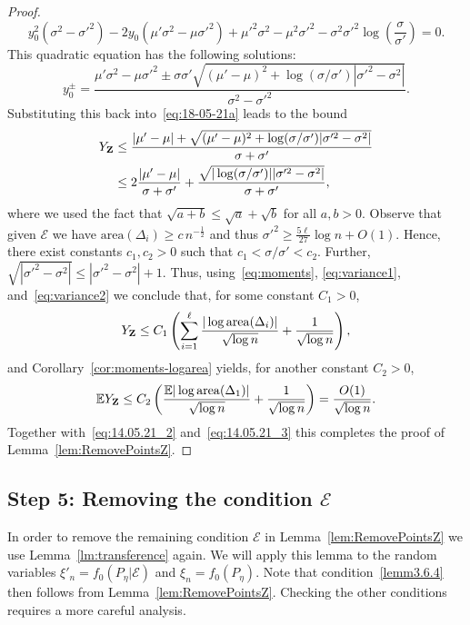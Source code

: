 \documentclass[AHL,Unicode,longabstracts,published]{cedram}
\newcommand{\bbE}{\mathbb{E}}
\newcommand{\clE}{\mathcal{E}}
\newcommand{\area}{\mathrm{area}}
\begin{document}
\begin{proof}
\[
y_0^2\left(\sigma^2-\sigma'^2\right)-2y_0\left(\mu'\sigma^2-\mu\sigma'^2\right)+\mu'^2\sigma^2-\mu^2\sigma'^2-\sigma^2\sigma'^2\log\left(\frac{\sigma}{\sigma'}\right)=0.
\]
This quadratic equation has the following solutions:
\[
y^{\pm}_0=\frac{\mu'\sigma^2-\mu\sigma'^2\pm\sigma\sigma'\sqrt{(\mu'-\mu)^2+\log(\sigma/\sigma')|\sigma'^2-\sigma^2|}}{\sigma^2-\sigma'^2}.
\]
Substituting this back into~\eqref{eq:18-05-21a} leads to the bound
\begin{align*}
Y_{\bf{Z}} & \leq \frac{|\mu'-\mu|+\sqrt{(\mu'-\mu)^2+\log(\sigma/\sigma')|\sigma'^2-\sigma^2|}}{\sigma+\sigma'}
\\ & \leq 2\frac{|\mu'-\mu|}{\sigma+\sigma'} + \frac{\sqrt{|\log(\sigma/ \sigma')||\sigma'^2-\sigma^2|}}{\sigma+\sigma'},
\end{align*}
where we used the fact that $\sqrt{a+b} \leq \sqrt a + \sqrt b$ for all $a,b>0$. Observe that given $\clE$ we have ${\area}(\Delta_i) \geq c\, n^{- \frac 12}$ and thus $\sigma'^2 \geq \frac{5 \ell}{27}\log n +O(1)$. Hence, there exist constants $c_1,c_2>0$ such that $c_1<\sigma/\sigma'<c_2$. Further, $\sqrt{|\sigma'^2-\sigma^2|} \leq |\sigma'^2-\sigma^2|+1$. Thus, using~\eqref{eq:moments}, \eqref{eq:variance1}, and~\eqref{eq:variance2} we conclude that, for some constant $C_1>0$,
\[
Y_{\bf{Z}}\leq C_1\left(\sum_{i=1}^\ell \frac{|\log{\area}(\Delta_i)|}{\sqrt{\log n}}+\frac{1}{\sqrt{\log n}}\right),
\]
and Corollary~\ref{cor:moments-logarea} yields, for another constant $C_2>0$,
\[
\bbE Y_{\bf{Z}}\leq C_2\left(\frac{\bbE|\log{\area}(\Delta_1)|}{\sqrt{\log n}}+\frac{1}{\sqrt{\log n}} \right) = \frac{O(1)}{\sqrt{\log n}}.
\]
Together with~\eqref{eq:14.05.21_2} and~\eqref{eq:14.05.21_3} this completes the proof of Lemma~\ref{lem:RemovePointsZ}.
\end{proof}



\subsection{Step 5: Removing the condition \texorpdfstring{$\clE$}{E}}
\label{step5}

In order to remove the remaining condition $\clE$ in Lemma~\ref{lem:RemovePointsZ} we use Lemma~\ref{lm:transference} again. We will apply this lemma to the random variables $\xi'_n=f_0(P_{\eta}|\clE)$ and $\xi_n=f_0(P_{\eta})$. Note that condition~\eqref{lemm3.6.4} then follows from Lemma~\ref{lem:RemovePointsZ}. Checking the other conditions requires a more careful analysis.
\end{document}

